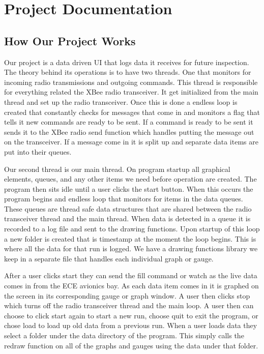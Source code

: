 \documentclass[10pt,draftclsnofoot,onecolumn,retainorgcmds]{IEEEtran}
\begin{document}
\section{Project Documentation}
\subsection{How Our Project Works}
Our project is a data driven UI that logs data it receives for future inspection. The theory behind its operations is to have two threads. One that monitors for incoming radio transmissions and outgoing commands. This thread is responsible for everything related the XBee radio transceiver. It get initialized from the main thread and set up the radio transceiver. Once this is done a endless loop is created that constantly checks for messages that come in and monitors a flag that tells it new commands are ready to be sent. If a command is ready to be sent it sends it to the XBee radio send function which handles putting the message out on the transceiver. If a message come in it is split up and separate data items are put into their queues. \par
Our second thread is our main thread. On program startup all graphical elements, queues, and any other items we need before operation are created. The program then sits idle until a user clicks the start button. When this occurs the program begins and endless loop that monitors for items in the data queues. These queues are thread safe data structures that are shared between the radio transceiver thread and the main thread. When data is detected in a queue it is recorded to a log file and sent to the drawing functions. Upon startup of this loop a new folder is created that is timestamp at the moment the loop begins. This is where all the data for that run is logged. We have a drawing functions library we keep in a separate file that handles each individual graph or gauge. \par
After a user clicks start they can send the fill command or watch as the live data comes in from the ECE avionics bay. As each data item comes in it is graphed on the screen in its corresponding gauge or graph window. A user then clicks stop which turns off the radio transceiver thread and the main loop. A user then can choose to click start again to start a new run, choose quit to exit the program, or chose load to load up old data from a previous run. When a user loads data they select a folder under the data directory of the program. This simply calls the redraw function on all of the graphs and gauges using the data under that folder. \par
\end{document}
